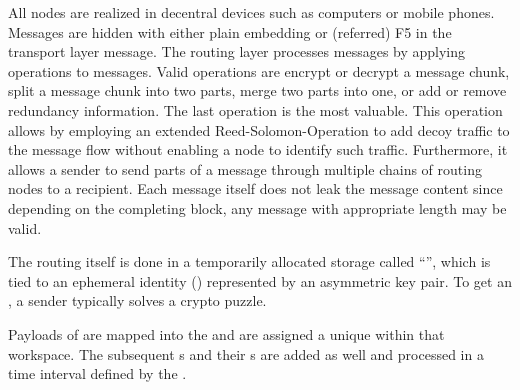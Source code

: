 All nodes are realized in decentral devices such as computers or mobile phones. Messages are hidden with either plain embedding or (referred) F5 in the transport layer message. The routing layer processes messages by applying operations to messages. Valid operations are encrypt or decrypt a message chunk, split a message chunk into two parts, merge two parts into one, or add or remove redundancy information. The last operation is the most valuable. This operation allows by employing an extended Reed-Solomon-Operation to add decoy traffic to the message flow without enabling a node to identify such traffic. Furthermore, it allows a sender to send parts of a message through multiple chains of routing nodes to a recipient. Each message itself does not leak the message content since depending on the completing block, any message with appropriate length may be valid.

The routing itself is done in a temporarily allocated storage called ``'', which is tied to an ephemeral identity () represented by an asymmetric key pair. To get an , a sender typically solves a crypto puzzle. 

Payloads of \VortexMessages{} are mapped into the  and are assigned a unique  within that workspace. The subsequent s and their s are added as well and processed in a time interval defined by the .

